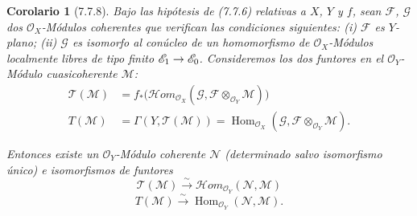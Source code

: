 \documentclass[10pt,oneside,openany]{book}
\theoremstyle{egaenv}\newtheorem*{env}{---}
\theoremstyle{egastatement}
\newtheorem*{corollary}{Corolario}
\theoremstyle{egadescription}
\renewcommand{\to}{\mathchoice{\longrightarrow}{\rightarrow}{\rightarrow}{\rightarrow}}
\begin{document}
\begin{corollary}[7.7.8]
Bajo las hipótesis de \textup{(7.7.6)} relativas a $X$, $Y$ y $f$, sean $\mathscr F$,
$\mathscr G$ dos $\mathscr O_X$-Módulos coherentes que verifican las condiciones
siguientes: \textup{(i)} $\mathscr F$ es $Y$-plano; \textup{(ii)} $\mathscr G$ es isomorfo al
conúcleo de un homomorfismo de $\mathscr O_X$-Módulos localmente libres de tipo
finito $\mathscr E_1\to\mathscr E_0$. Consideremos los dos funtores en el
$\mathscr O_Y$-Módulo cuasicoherente $\mathscr M$:
\begin{align*}
  \mathscr T(\mathscr M)
  &=
  f_*
  \bigl(
    \mathscr{H}\!om_{\mathscr O_X}
      (\mathscr G,\mathscr F\otimes_{\mathscr O_Y}\mathscr M)
  \bigr)\\
  T(\mathscr M)
  &=
  \Gamma(Y,\mathscr T(\mathscr M))
  =
  \operatorname{Hom}_{\mathscr O_X}
    (\mathscr G,\mathscr F\otimes_{\mathscr O_Y}\mathscr M).
\end{align*}

Entonces existe un $\mathscr O_Y$-Módulo coherente $\mathscr N$ (determinado salvo
isomorfismo único) e isomorfismos de funtores
\[
  \mathscr T(\mathscr M)
  \xrightarrow{\sim}
  \mathscr{H}\!om_{\mathscr O_Y}(\mathscr N,\mathscr M)
  \tag{7.7.8.1}\label{III.7.7.8.1.fr}
\]
\[
  T(\mathscr M)
  \xrightarrow{\sim}
  \operatorname{Hom}_{\mathscr O_Y}(\mathscr N,\mathscr M).
  \tag{7.7.8.2}\label{III.7.7.8.2.fr}
\]
\end{corollary}
\end{document}
